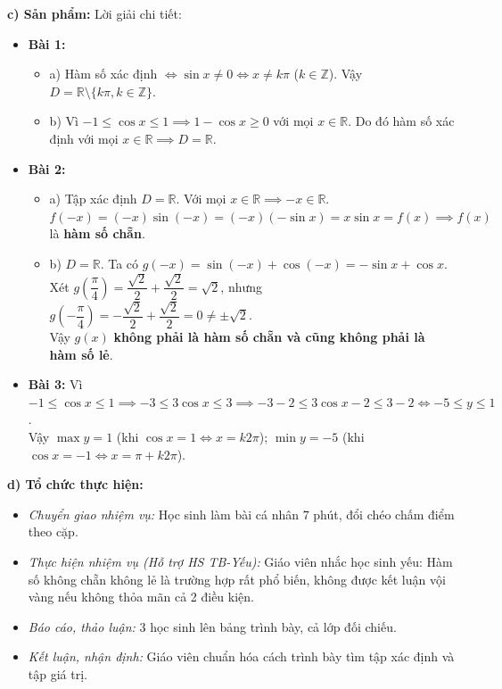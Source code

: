 \documentclass[12pt, a4paper]{article}
\begin{document}
\textbf{c) Sản phẩm:} Lời giải chi tiết:
\begin{itemize}[leftmargin=0.6cm]
    \item \textbf{Bài 1:}
    \begin{itemize}[leftmargin=0.5cm]
        \item a) Hàm số xác định $\iff \sin x \neq 0 \iff x \neq k\pi$ ($k \in \mathbb{Z}$). Vậy $D = \mathbb{R} \setminus \{k\pi, k \in \mathbb{Z}\}$.
        \item b) Vì $-1 \le \cos x \le 1 \implies 1 - \cos x \ge 0$ với mọi $x \in \mathbb{R}$. Do đó hàm số xác định với mọi $x \in \mathbb{R} \implies D = \mathbb{R}$.
    \end{itemize}
    \item \textbf{Bài 2:}
    \begin{itemize}[leftmargin=0.5cm]
        \item a) Tập xác định $D = \mathbb{R}$. Với mọi $x \in \mathbb{R} \implies -x \in \mathbb{R}$.\\
        $f(-x) = (-x) \sin(-x) = (-x)(-\sin x) = x \sin x = f(x) \implies f(x)$ là \textbf{hàm số chẵn}.
        \item b) $D = \mathbb{R}$. Ta có $g(-x) = \sin(-x) + \cos(-x) = -\sin x + \cos x$.\\
        Xét $g\left(\dfrac{\pi}{4}\right) = \dfrac{\sqrt{2}}{2} + \dfrac{\sqrt{2}}{2} = \sqrt{2}$, nhưng $g\left(-\dfrac{\pi}{4}\right) = -\dfrac{\sqrt{2}}{2} + \dfrac{\sqrt{2}}{2} = 0 \neq \pm \sqrt{2}$.\\
        Vậy $g(x)$ \textbf{không phải là hàm số chẵn và cũng không phải là hàm số lẻ}.
    \end{itemize}
    \item \textbf{Bài 3:}
    Vì $-1 \le \cos x \le 1 \implies -3 \le 3\cos x \le 3 \implies -3 - 2 \le 3\cos x - 2 \le 3 - 2 \iff -5 \le y \le 1$.\\
    Vậy $\max y = 1$ (khi $\cos x = 1 \iff x = k2\pi$); $\min y = -5$ (khi $\cos x = -1 \iff x = \pi + k2\pi$).
\end{itemize}

\textbf{d) Tổ chức thực hiện:}
\begin{itemize}[leftmargin=0.6cm]
    \item \textit{Chuyển giao nhiệm vụ:} Học sinh làm bài cá nhân 7 phút, đổi chéo chấm điểm theo cặp.
    \item \textit{Thực hiện nhiệm vụ (Hỗ trợ HS TB-Yếu):} Giáo viên nhắc học sinh yếu: Hàm số không chẵn không lẻ là trường hợp rất phổ biến, không được kết luận vội vàng nếu không thỏa mãn cả 2 điều kiện.
    \item \textit{Báo cáo, thảo luận:} 3 học sinh lên bảng trình bày, cả lớp đối chiếu.
    \item \textit{Kết luận, nhận định:} Giáo viên chuẩn hóa cách trình bày tìm tập xác định và tập giá trị.
\end{itemize}
\end{document}
